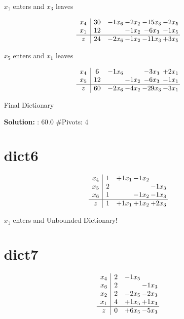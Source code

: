 \documentclass[10pt]{article}
\begin{document}
 $ x_{1} $ enters and $ x_{3} $ leaves 

 \[\begin{array}{c| c c@{\hskip 2pt} c@{\hskip 2pt} c@{\hskip 2pt} c@{\hskip 2pt} }
 x_{4}   &  30 & -1  x_{6} & -2  x_{2} & -15  x_{3} & -2  x_{5}\\
 x_{1}   &  12  &   & -1  x_{2} & -6  x_{3} & -1  x_{5}\\
\hline
z    &  24 & -2  x_{6} & -1  x_{2} & -11  x_{3} & + 3  x_{5}\\
\end{array}\]


 $ x_{5} $ enters and $ x_{1} $ leaves 

 \[\begin{array}{c| c c@{\hskip 2pt} c@{\hskip 2pt} c@{\hskip 2pt} c@{\hskip 2pt} }
 x_{4}   &  6 & -1  x_{6} &   & -3  x_{3} & + 2  x_{1}\\
 x_{5}   &  12  &   & -1  x_{2} & -6  x_{3} & -1  x_{1}\\
\hline
z    &  60 & -2  x_{6} & -4  x_{2} & -29  x_{3} & -3  x_{1}\\
\end{array}\]


 Final Dictionary
\par \noindent\textbf{Solution:} :  60.0
\#Pivots:  4
\section{dict6}

\[\begin{array}{c| c c@{\hskip 2pt} c@{\hskip 2pt} c@{\hskip 2pt} }
 x_{4}   &  1 & + 1  x_{1} & -1  x_{2} &   \\
 x_{5}   &  2  &    &   & -1  x_{3}\\
 x_{6}   &  1  &   & -1  x_{2} & -1  x_{3}\\
\hline
z    &  1 & + 1  x_{1} & + 1  x_{2} & + 2  x_{3}\\
\end{array}\]


 $ x_{1} $ enters and Unbounded Dictionary!
\section{dict7}

\[\begin{array}{c| c c@{\hskip 2pt} c@{\hskip 2pt} }
 x_{4}   &  2 & -1  x_{5} &   \\
 x_{6}   &  2  &   & -1  x_{3}\\
 x_{2}   &  2 & -2  x_{5} & -2  x_{3}\\
 x_{1}   &  4 & + 1  x_{5} & + 1  x_{3}\\
\hline
z    &  0 & + 6  x_{5} & -5  x_{3}\\
\end{array}\]
\end{document}
